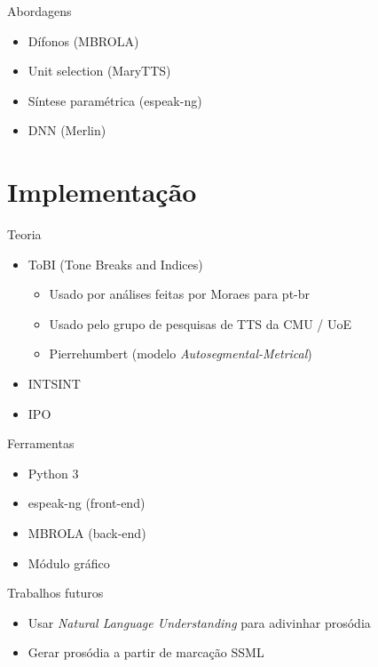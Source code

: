 \documentclass{beamer}
\begin{document}
\begin{frame}{Abordagens}
  \begin{itemize}
    \item Dífonos (MBROLA)
    \item Unit selection (MaryTTS)
    \item Síntese paramétrica (espeak-ng)
    \item DNN (Merlin)
  \end{itemize}
\end{frame}

\section{Implementação}
\begin{frame}{Teoria}
  \begin{itemize}
  \item ToBI (Tone Breaks and Indices)
    \begin{itemize}
    \item Usado por análises feitas por Moraes para pt-br
    \item Usado pelo grupo de pesquisas de TTS da CMU / UoE
    \item Pierrehumbert (modelo \emph{Autosegmental-Metrical})
    \end{itemize}
  \item INTSINT
  \item IPO
  \end{itemize}
\end{frame}

\begin{frame}{Ferramentas}
  \begin{itemize}
    \item Python 3
    \item espeak-ng (front-end)
    \item MBROLA (back-end)
    \item Módulo gráfico
  \end{itemize}
\end{frame}

\begin{frame}{Trabalhos futuros}
  \begin{itemize}
    \item Usar \emph{Natural Language Understanding} para adivinhar prosódia
    \item Gerar prosódia a partir de marcação SSML
  \end{itemize}
\end{frame}
\end{document}
